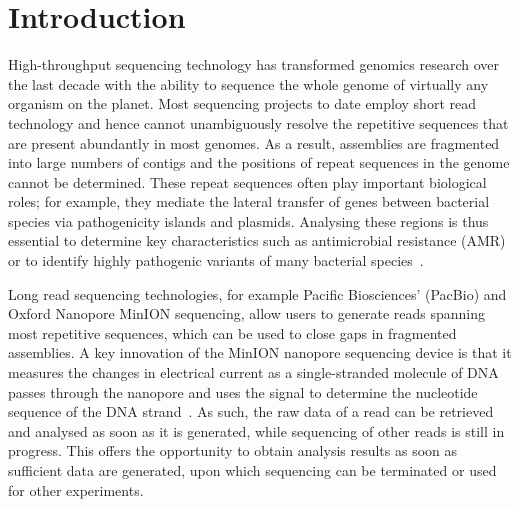 \section{Introduction}

High-throughput sequencing technology has transformed genomics research over the
last decade with the ability to sequence the whole genome of virtually any
organism on the planet. Most sequencing projects to date employ short read
technology and hence cannot unambiguously resolve the repetitive sequences that
are present abundantly in most genomes. As a result, assemblies are fragmented
into large numbers of contigs and the positions of repeat sequences in the
genome cannot be determined. These repeat sequences often play important
biological roles; for example, they mediate the lateral transfer of genes
between bacterial species via pathogenicity islands and plasmids. Analysing
these regions is thus essential to determine key characteristics such as
antimicrobial resistance (AMR) or to identify highly pathogenic variants of many
bacterial species~\cite{AshtonND2015}.

Long read sequencing technologies, for example Pacific Biosciences' (PacBio) and
Oxford Nanopore MinION sequencing, allow users to generate reads spanning most
repetitive sequences, which can be used to close gaps in fragmented assemblies.
A key innovation of the MinION nanopore sequencing device is that it
measures the changes in electrical current as a single-stranded molecule of DNA
passes through the nanopore and uses the signal to determine the nucleotide
sequence of the DNA strand~\cite{KasianowiczBB1996, BrantonDM2008, StoddartHM2009}. 
As such, the raw data of a read can be retrieved and analysed
as soon as it is generated, while sequencing of other reads is
still in progress.
This offers the opportunity to obtain analysis results as
soon as sufficient data are generated, upon which sequencing can be terminated
or used for other experiments.

